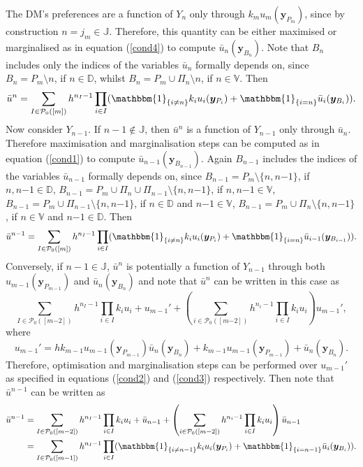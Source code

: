 The DM's preferences are a function of $Y_n$ only through $k_mu_m(\bm{y}_{P_m})$, since by construction $n=j_m\in\mathbb{J}$. Therefore, this quantity can be either maximised or marginalised as in equation (\ref{cond4}) to compute $\bar{u}_n(\bm{y}_{B_n})$. Note that $B_n$ includes only the indices of the variables $\bar{u}_n$ formally depends on, since $B_n=P_m\setminus n$, if $n\in\mathbb{D}$, whilst $B_n=P_m\cup \Pi_n\setminus n$, if $n\in\mathbb{V}$. Then 
\begin{equation*}
\label{eq:proofpro}
\bar{u}^n=\sum_{I\in\mathcal{P}_0([m])}h^{n_I-1}\prod_{i\in I}(\mathbbm{1}_{\{i\neq n\}} k_iu_i(\bm{y}_{P_i})+\mathbbm{1}_{\{i=n\}}\bar{u}_i(\bm{y}_{B_i})).
\end{equation*}
Now consider $Y_{n-1}$. If $n-1\not\in \mathbb{J}$, then $\bar{u}^n$ is a function of $Y_{n-1}$ only through $\bar{u}_n$. Therefore maximisation and marginalisation steps can be computed as in equation (\ref{cond1}) to compute $\bar{u}_{n-1}(\bm{y}_{B_{n-1}})$. Again $B_{n-1}$ includes the indices of the variables $\bar{u}_{n-1}$ formally depends on, since $B_{n-1}=P_m\setminus\{n,n{-1}\}$, if $n,n{-1}\in\mathbb{D}$, $B_{n-1}=P_m\cup\Pi_n\cup\Pi_{n-1}\setminus\{n,n{-1}\}$, if $n,n{-1}\in\mathbb{V}$, $B_{n-1}=P_m\cup\Pi_{n-1}\setminus\{n,n{-1}\}$, if $n\in\mathbb{D}$ and $n{-1}\in\mathbb{V}$,  $B_{n-1}=P_m\cup\Pi_n\setminus\{n,n{-1}\}$, if $n\in\mathbb{V}$ and $n{-1}\in\mathbb{D}$. Then 
\begin{equation*}
\bar{u}^{n-1}=\sum_{I\in\mathcal{P}_0([m])}h^{n_I-1}\prod_{i\in I}(\mathbbm{1}_{\{i\neq n\}} k_iu_i(\bm{y}_{P_i})+\mathbbm{1}_{\{i=n\}}\bar{u}_{i-1}(\bm{y}_{B_{i-1}})).
\end{equation*}
 Conversely, if $n-1\in\mathbb{J}$, $\bar{u}^n$ is potentially a function of $Y_{n-1}$ through both $u_{m-1}(\bm{y}_{P_{m-1}})$ and $\bar{u}_n(\bm{y}_{B_n})$ and note that $\bar{u}^n$ can be written in this case as
\begin{equation*}
\sum_{I\in\mathcal{P}_0([m{-2}])}h^{n_I-1}\prod_{i\in I}k_iu_i+u_{m-1}'+\left(\sum_{i\in\mathcal{P}_0([m{-2}])}h^{n_i-1}\prod_{i\in I}k_iu_i\right)u_{m-1}', 
\end{equation*}  
where 
\begin{equation*}
u_{m-1}'=hk_{m-1}u_{m-1}(\bm{y}_{P_{m-1}})\bar{u}_n(\bm{y}_{B_n})+k_{m-1}u_{m-1}(\bm{y}_{P_{m-1}})+\bar{u}_n(\bm{y}_{B_n}).
\end{equation*}
Therefore, optimisation and marginalisation steps can be performed over $u_{m-1}'$ as specified in equations (\ref{cond2}) and (\ref{cond3}) respectively. Then note that $\bar{u}^{n-1}$ can be written as 
\begin{align*}
\bar{u}^{n-1}&=\sum_{I\in\mathcal{P}_0([m{-2}])}h^{n_I-1}\prod_{i\in I}k_iu_i+\bar{u}_{n-1}+\left(\sum_{i\in\mathcal{P}_0([m{-2}])}h^{n_i-1}\prod_{i\in I}k_iu_i\right)\bar{u}_{n-1}\\
&=\sum_{I\in\mathcal{P}_0([m{-1}])}h^{n_I-1}\prod_{i\in I}(\mathbbm{1}_{\{i\neq n-1\}} k_iu_i(\bm{y}_{P_i})+\mathbbm{1}_{\{i=n-1\}}\bar{u}_i(\bm{y}_{B_i})).
\end{align*}

